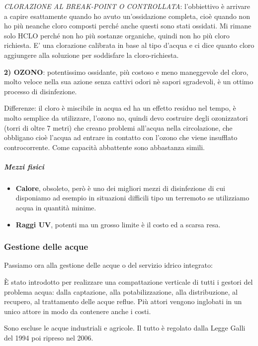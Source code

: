 \emph{CLORAZIONE AL BREAK-POINT O CONTROLLATA}: l'obbiettivo è arrivare
a capire esattamente quando ho avuto un'ossidazione completa, cioè
quando non ho più neanche cloro composti perché anche questi sono stati
ossidati. Mi rimane solo HCLO perché non ho più sostanze organiche,
quindi non ho più cloro richiesta. E' una clorazione calibrata in base
al tipo d'acqua e ci dice quanto cloro aggiungere alla soluzione per
soddisfare la cloro-richiesta.

\textbf{2) OZONO}: potentissimo ossidante, più costoso e meno
maneggevole del cloro, molto veloce nella sua azione senza cattivi odori
nè sapori sgradevoli, è un ottimo processo di disinfezione.

Differenze: il cloro è miscibile in acqua ed ha un effetto residuo nel
tempo, è molto semplice da utilizzare, l'ozono no, quindi devo costruire
degli ozonizzatori (torri di oltre 7 metri) che creano problemi
all'acqua nella circolazione, che obbligano cioè l'acqua ad entrare in
contatto con l'ozono che viene insufflato controcorrente. Come capacità
abbattente sono abbastanza simili.

\subparagraph{Mezzi fisici}

\begin{itemize}
\item
  \textbf{Calore}, obsoleto, però è uno dei migliori mezzi di
  disinfezione di cui disponiamo ad esempio in situazioni difficili tipo
  un terremoto se utilizziamo acqua in quantità minime.
\item
  \textbf{Raggi UV}, potenti ma un grosso limite è il costo ed a scarsa
  resa.
\end{itemize}

\subsubsection{Gestione delle acque}

Passiamo ora alla gestione delle acque o del servizio idrico integrato:

È stato introdotto per realizzare una compattazione verticale di tutti i
gestori del problema acqua: dalla captazione, alla potabilizzazione,
alla distribuzione, al recupero, al trattamento delle acque reflue. Più
attori vengono inglobati in un unico attore in modo da contenere anche i
costi.

Sono escluse le acque industriali e agricole. Il tutto è regolato dalla
Legge Galli del 1994 poi ripreso nel 2006.

